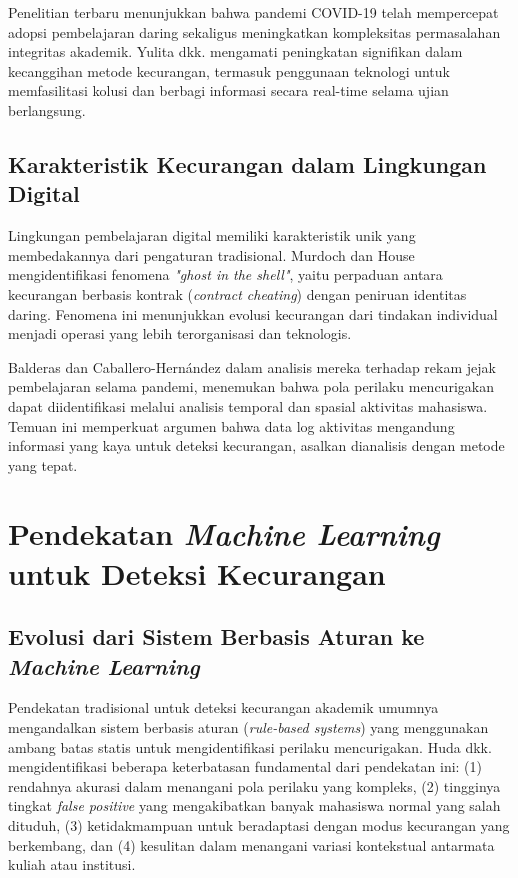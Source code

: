 Penelitian terbaru menunjukkan bahwa pandemi COVID-19 telah mempercepat adopsi pembelajaran daring sekaligus meningkatkan kompleksitas permasalahan integritas akademik. Yulita dkk. \cite{Yulita2023} mengamati peningkatan signifikan dalam kecanggihan metode kecurangan, termasuk penggunaan teknologi untuk memfasilitasi kolusi dan berbagi informasi secara real-time selama ujian berlangsung.

\subsection{Karakteristik Kecurangan dalam Lingkungan Digital}

Lingkungan pembelajaran digital memiliki karakteristik unik yang membedakannya dari pengaturan tradisional. Murdoch dan House \cite{Murdoch2019} mengidentifikasi fenomena \textit{"ghost in the shell"}, yaitu perpaduan antara kecurangan berbasis kontrak (\textit{contract cheating}) dengan peniruan identitas daring. Fenomena ini menunjukkan evolusi kecurangan dari tindakan individual menjadi operasi yang lebih terorganisasi dan teknologis.

Balderas dan Caballero-Hernández \cite{Balderas2020} dalam analisis mereka terhadap rekam jejak pembelajaran selama pandemi, menemukan bahwa pola perilaku mencurigakan dapat diidentifikasi melalui analisis temporal dan spasial aktivitas mahasiswa. Temuan ini memperkuat argumen bahwa data log aktivitas mengandung informasi yang kaya untuk deteksi kecurangan, asalkan dianalisis dengan metode yang tepat.

\section{Pendekatan \textit{Machine Learning} untuk Deteksi Kecurangan}
\label{sec:mlApproaches}

\subsection{Evolusi dari Sistem Berbasis Aturan ke \textit{Machine Learning}}

Pendekatan tradisional untuk deteksi kecurangan akademik umumnya mengandalkan sistem berbasis aturan (\textit{rule-based systems}) yang menggunakan ambang batas statis untuk mengidentifikasi perilaku mencurigakan. Huda dkk. \cite{article:rule_based_limitations} mengidentifikasi beberapa keterbatasan fundamental dari pendekatan ini: (1) rendahnya akurasi dalam menangani pola perilaku yang kompleks, (2) tingginya tingkat \textit{false positive} yang mengakibatkan banyak mahasiswa normal yang salah dituduh, (3) ketidakmampuan untuk beradaptasi dengan modus kecurangan yang berkembang, dan (4) kesulitan dalam menangani variasi kontekstual antarmata kuliah atau institusi.

